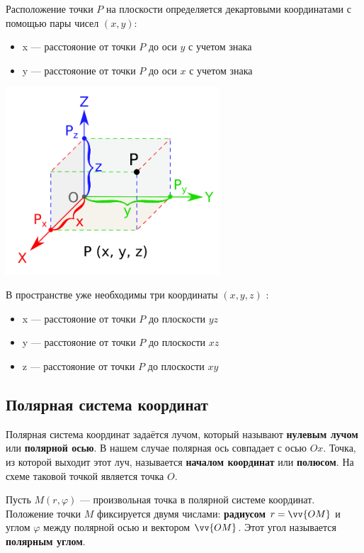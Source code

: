 \documentclass[a4paper,12pt]{extbook}
\theoremstyle{numbered}
\theoremstyle{named}
\theoremstyle{named}
\theoremstyle{named}
\begin{document}
Расположение точки \(P\) на плоскости определяется декартовыми координатами с помощью пары чисел \((x, y)\):
\begin{itemize}
    \item {x — расстояоние от точки \(P\) до оси \(y\) с учетом знака}
    \item {y — расстояоние от точки \(P\) до оси \(x\) с учетом знака}
\end{itemize}

\begin{center}
    \includegraphics[width=0.6\textwidth]{cartesian_system.png}
\end{center}

В пространстве уже необходимы три координаты \((x, y, z)\) :
\begin{itemize}
    \item {x — расстояоние от точки \(P\) до плоскости \(yz\)}
    \item {y — расстояоние от точки \(P\) до плоскости \(xz\)}
    \item {z — расстояоние от точки \(P\) до плоскости \(xy\)}
\end{itemize}

\subsection*{Полярная система координат}
Полярная система координат задаётся лучом, который называют \textbf{нулевым лучом} или \textbf{полярной осью}.
В нашем случае полярная ось совпадает с осью \(Ox\).
Точка, из которой выходит этот луч, называется \textbf{началом координат} или \textbf{полюсом}.
На схеме таковой точкой является точка \(O\).

Пусть \(M (r, \varphi)\) — произвольная точка в полярной системе координат.
Положение точки \(M\) фиксируется двумя числами: \textbf{радиусом} \(r = \vv{OM}\) и углом \(\varphi\) между полярной осью и вектором \(\vv{OM}\).
Этот угол называется \textbf{полярным углом}.
\end{document}
